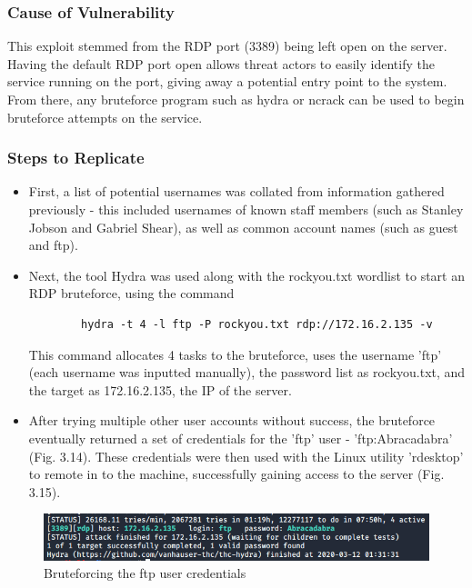\documentclass{report}
\begin{document}
\subsubsection{Cause of Vulnerability}
This exploit stemmed from the RDP port (3389) being left open on the server. Having the default RDP port open allows threat actors to easily identify the service running on the port, giving away a potential entry point to the system. From there, any bruteforce program such as hydra or ncrack can be used to begin bruteforce attempts on the service.
\subsubsection{Steps to Replicate}
\begin{itemize}
	\item First, a list of potential usernames was collated from information gathered previously - this included usernames of known staff members (such as Stanley Jobson and Gabriel Shear), as well as common account names (such as guest and ftp). 
	\item Next, the tool Hydra was used along with the rockyou.txt wordlist to start an RDP bruteforce, using the command 
	\begin{verbatim}
		hydra -t 4 -l ftp -P rockyou.txt rdp://172.16.2.135 -v
	\end{verbatim}
	This command allocates 4 tasks to the bruteforce, uses the username 'ftp' (each username was inputted manually), the password list as rockyou.txt, and the target as 172.16.2.135, the IP of the server.
	\item After trying multiple other user accounts without success, the bruteforce eventually returned a set of credentials for the 'ftp' user - 'ftp:Abracadabra' (Fig. 3.14). These credentials were then used with the Linux utility 'rdesktop' to remote in to the machine, successfully gaining access to the server (Fig. 3.15).
\end{itemize}
\begin{figure}[!htb]
	\centering
	\includegraphics[scale=0.6]{img/rdp1.png}
	\caption{Bruteforcing the ftp user credentials}
\end{figure}
\end{document}
